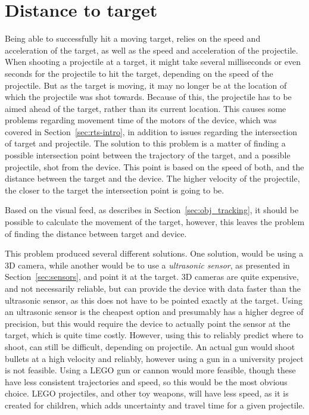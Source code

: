 
\section{Distance to target}
Being able to successfully hit a moving target, relies on the speed and acceleration of the target, as well as the speed and acceleration of the projectile.
When shooting a projectile at a target, it might take several milliseconds or even seconds for the projectile to hit the target, depending on the speed of the projectile.
But as the target is moving, it may no longer be at the location of which the projectile was shot towards.
Because of this, the projectile has to be aimed ahead of the target, rather than its current location.
This causes some problems regarding movement time of the motors of the device, which was covered in Section~\ref{sec:rts-intro}, in addition to issues regarding the intersection of target and projectile.
The solution to this problem is a matter of finding a possible intersection point between the trajectory of the target, and a possible projectile, shot from the device. 
This point is based on the speed of both, and the distance between the target and the device. 
The higher velocity of the projectile, the closer to the target the intersection point is going to be.

Based on the visual feed, as describes in Section~\ref{sec:obj_tracking}, it should be possible to calculate the movement of the target, however, this leaves the problem of finding the distance between target and device.

This problem produced several different solutions.
One solution, would be using a 3D camera, while another would be to use a \textit{ultrasonic sensor}, as presented in Section~\ref{sec:sensors}, and point it at the target.
3D cameras are quite expensive, and not necessarily reliable, but can provide the device with data faster than the ultrasonic sensor, as this does not have to be pointed exactly at the target.
Using an ultrasonic sensor is the cheapest option and presumably has a higher degree of precision, but this would require the device to actually point the sensor at the target, which is quite time costly.
However, using this to reliably predict where to shoot, can still be difficult, depending on projectile.
An actual gun would shoot bullets at a high velocity and reliably, however using a gun in a university project is not feasible.
Using a LEGO gun or cannon would more feasible, though these have less consistent trajectories and speed, so this would be the most obvious choice.
LEGO projectiles, and other toy weapons, will have less speed, as it is created for children, which adds uncertainty and travel time for a given projectile.

